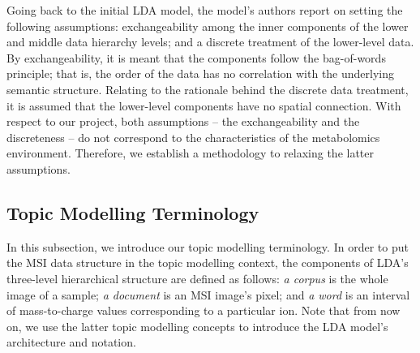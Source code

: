 \documentclass{mpaper}
\begin{document}
\par Going back to the initial LDA model, the model's authors report on setting the following assumptions: exchangeability among the inner components of the lower and middle data hierarchy levels; and a discrete treatment of the lower-level data. By exchangeability, it is meant that the components follow the bag-of-words principle; that is, the order of the data has no correlation with the underlying semantic structure. Relating to the rationale behind the discrete data treatment, it is assumed that the lower-level components have no spatial connection. With respect to our project, both assumptions -- the exchangeability and the discreteness -- do not correspond to the characteristics of the metabolomics environment. Therefore, we establish a methodology to relaxing the latter assumptions.

\subsection{Topic Modelling Terminology}

\par In this subsection, we introduce our topic modelling terminology. In order to put the MSI data structure in the topic modelling context, the components of LDA's three-level hierarchical structure are defined as follows: \textit{a corpus} is the whole image of a sample; \textit{a document} is an MSI image's pixel; and \textit{a word} is an interval of mass-to-charge values corresponding to a particular ion. Note that from now on, we use the latter topic modelling concepts to introduce the LDA model's architecture and notation.
\end{document}
